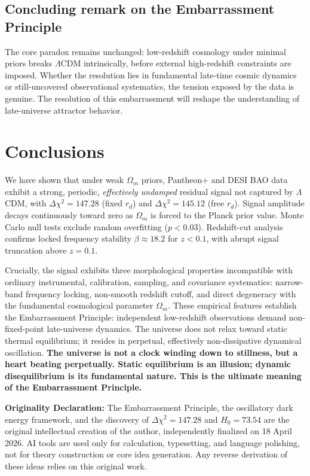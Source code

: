 \documentclass[10pt,a4paper,twocolumn]{article}
\begin{document}
\subsection{Concluding remark on the Embarrassment Principle}
The core paradox remains unchanged: low-redshift cosmology under minimal priors breaks $\Lambda$CDM intrinsically, before external high-redshift constraints are imposed. Whether the resolution lies in fundamental late-time cosmic dynamics or still-uncovered observational systematics, the tension exposed by the data is genuine. The resolution of this embarrassment will reshape the understanding of late-universe attractor behavior.

\section{Conclusions}
We have shown that under weak $\Omega_m$ priors, Pantheon+ and DESI BAO data exhibit a strong, periodic, \emph{effectively undamped} residual signal not captured by $\Lambda$CDM, with $\Delta\chi^2=147.28$ (fixed $r_d$) and $\Delta\chi^2=145.12$ (free $r_d$). Signal amplitude decays continuously toward zero as $\Omega_m$ is forced to the Planck prior value. Monte Carlo null tests exclude random overfitting ($p<0.03$). Redshift-cut analysis confirms locked frequency stability $\beta\approx18.2$ for $z<0.1$, with abrupt signal truncation above $z=0.1$.

Crucially, the signal exhibits three morphological properties incompatible with ordinary instrumental, calibration, sampling, and covariance systematics: narrow-band frequency locking, non-smooth redshift cutoff, and direct degeneracy with the fundamental cosmological parameter $\Omega_m$. These empirical features establish the Embarrassment Principle: independent low-redshift observations demand non-fixed-point late-universe dynamics. The universe does not relax toward static thermal equilibrium; it resides in perpetual, effectively non-dissipative dynamical oscillation.
\textbf{The universe is not a clock winding down to stillness, but a heart beating perpetually. Static equilibrium is an illusion; dynamic disequilibrium is its fundamental nature. This is the ultimate meaning of the Embarrassment Principle.}

\vspace{1em}
\noindent
\textbf{Originality Declaration:}
The Embarrassment Principle, the oscillatory dark energy framework,
and the discovery of $\Delta\chi^2=147.28$ and $H_0=73.54$
are the original intellectual creation of the author,
independently finalized on 18 April 2026.
AI tools are used only for calculation, typesetting, and language polishing,
not for theory construction or core idea generation.
Any reverse derivation of these ideas relies on this original work.
\end{document}
